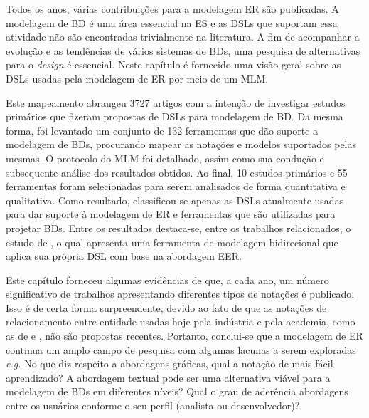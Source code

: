 Todos os anos, várias contribuições para a modelagem \ac{ER} são publicadas. 
A modelagem de \ac{BD} é uma área essencial na \ac{ES} e as \acp{DSL} que suportam essa atividade não são encontradas trivialmente na literatura.
A fim de acompanhar a evolução e as tendências de vários sistemas de \acp{BD}, uma pesquisa de alternativas para o \textit{design} é essencial. 
Neste capítulo é fornecido uma visão geral sobre as \acp{DSL} usadas pela modelagem de \ac{ER} por meio de um \ac{MLM}.


Este mapeamento abrangeu 3727 artigos com a intenção de investigar estudos primários que fizeram propostas de \acp{DSL} para modelagem de \ac{BD}. 
Da mesma forma, foi levantado um conjunto de 132 ferramentas que dão suporte a modelagem de \acp{BD}, procurando mapear as notações e modelos suportados pelas mesmas.
O protocolo do \ac{MLM} foi detalhado, assim como sua condução e subsequente análise dos resultados obtidos.
Ao final, 10 estudos primários e 55 ferramentas foram selecionadas para serem analisados de forma quantitativa e qualitativa. 
Como resultado, classificou-se apenas as \acp{DSL} atualmente usadas para dar suporte à modelagem de \ac{ER} e ferramentas que são utilizadas para projetar \acp{BD}.
Entre os resultados destaca-se, entre os trabalhos relacionados, o estudo de , o qual apresenta uma ferramenta de modelagem bidirecional que aplica sua própria \ac{DSL} com base na abordagem \ac{EER}.

Este capítulo forneceu algumas evidências de que, a cada ano, um número significativo de trabalhos apresentando diferentes tipos de notações é publicado.
Isso é de certa forma surpreendente, devido ao fato de que as notações de relacionamento entre entidade usadas hoje pela indústria e pela academia, como as de  e , não são propostas recentes.
Portanto, conclui-se que a modelagem de \ac{ER} continua um amplo campo de pesquisa com algumas lacunas a serem exploradas \textit{e.g.} No que diz respeito a abordagens gráficas, qual a notação de mais fácil aprendizado? A abordagem textual pode ser uma alternativa viável para a modelagem de \acp{BD} em diferentes níveis? Qual o grau de aderência abordagens entre os usuários conforme o seu perfil (analista ou desenvolvedor)?. 

